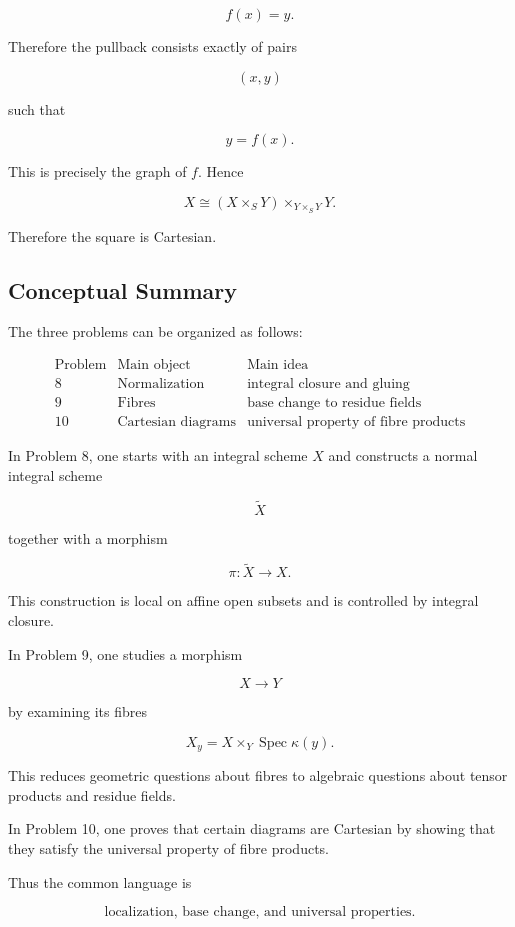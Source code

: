 \documentclass[12pt,a4paper]{article}
\theoremstyle{notespace}
\begin{document}
\[
f(x)=y.
\]

Therefore the pullback consists exactly of pairs

\[
(x,y)
\]

such that

\[
y=f(x).
\]

This is precisely the graph of \(f\). Hence

\[
X
\cong
(X\times_S Y)\times_{Y\times_S Y}Y.
\]

Therefore the square is Cartesian.

\subsection{Conceptual Summary}

The three problems can be organized as follows:

\[
\begin{array}{c|c|c}
	\text{Problem} & \text{Main object} & \text{Main idea} \\
	\hline
	8 & \text{Normalization} & \text{integral closure and gluing} \\
	9 & \text{Fibres} & \text{base change to residue fields} \\
	10 & \text{Cartesian diagrams} & \text{universal property of fibre products}
\end{array}
\]

In Problem 8, one starts with an integral scheme \(X\) and constructs a normal integral scheme

\[
\widetilde{X}
\]

together with a morphism

\[
\pi:\widetilde{X}\to X.
\]

This construction is local on affine open subsets and is controlled by integral closure.

In Problem 9, one studies a morphism

\[
X\to Y
\]

by examining its fibres

\[
X_y=X\times_Y \operatorname{Spec}\kappa(y).
\]

This reduces geometric questions about fibres to algebraic questions about tensor products and residue fields.

In Problem 10, one proves that certain diagrams are Cartesian by showing that they satisfy the universal property of fibre products.

Thus the common language is

\[
\boxed{
	\text{localization, base change, and universal properties.}
}
\]
\end{document}
